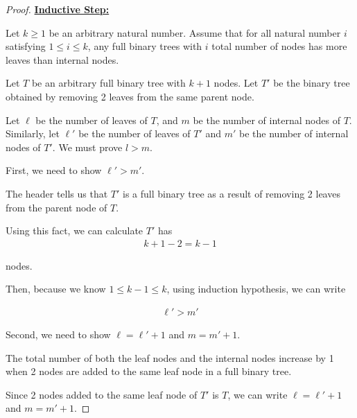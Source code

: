\documentclass[12pt]{article}
\begin{document}
\begin{itemize}
\begin{proof}
    \bigskip

    \underline{\textbf{Inductive Step:}}

    \bigskip

    Let $k \geq 1$ be an arbitrary natural number. Assume that for all natural
    number $i$ satisfying $1 \leq i \leq k$, any full binary trees with $i$
    total number of nodes has more leaves than internal nodes.

    \bigskip

    Let $T$ be an arbitrary full binary tree with $k+1$ nodes. Let $T'$
    be the binary tree obtained by removing 2 leaves from the same parent
    node.


    \bigskip

    Let $\ell$ be the number of leaves of $T$, and $m$ be the number of
    internal nodes of $T$. Similarly, let $\ell'$ be the number of leaves of
    $T'$ and $m'$ be the number of internal nodes of $T'$. We must prove
    $l > m$.

    \bigskip

    First, we need to show $\ell' > m'$.

    \bigskip

    The header tells us that $T'$ is a full binary tree as a result
    of removing 2 leaves from the parent node of $T$.

    \bigskip

    Using this fact, we can calculate $T'$ has
    \setcounter{equation}{0}
    \begin{align}
        k+1-2 = k-1
    \end{align}

    nodes.

    \bigskip

    Then, because we know $1 \leq k-1 \leq k$, using induction hypothesis,
    we can write

    \begin{align}
        \ell' > m'
    \end{align}

    \bigskip

    Second, we need to show $\ell = \ell' + 1$ and $m = m' + 1$.

    \bigskip

    The total number of both the leaf nodes and the internal
    nodes increase by 1 when 2 nodes are added to the same leaf node
    in a full binary tree.

    \bigskip

    Since 2 nodes added to the same leaf node of $T'$ is $T$, we can
    write $\ell = \ell' + 1$ and $m = m' + 1$.


\end{proof}
\end{itemize}
\end{document}
